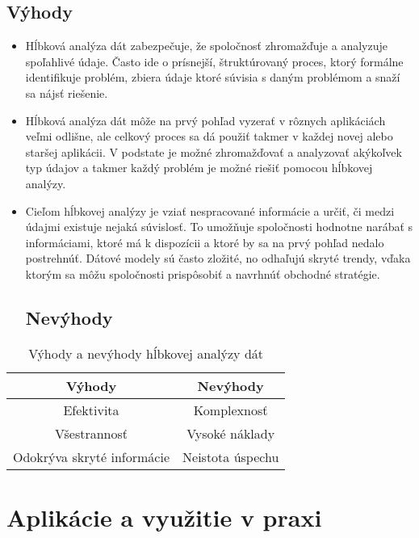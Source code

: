 \documentclass[10pt,twoside,slovak,a4paper]{article}
\begin{document}
\subsection{Výhody}
\begin{itemize}
\item Hĺbková analýza dát zabezpečuje, že spoločnosť zhromažďuje a analyzuje spoľahlivé údaje. Často ide o prísnejší, štruktúrovaný proces, ktorý formálne identifikuje problém, zbiera údaje ktoré súvisia s daným problémom a snaží sa nájsť riešenie.\cite{LunaCamp}
\item Hĺbková analýza dát môže na prvý pohľad vyzerať v rôznych aplikáciách veľmi odlišne, ale celkový proces sa dá použiť takmer v každej novej alebo staršej aplikácii. V podstate je možné zhromažďovať a analyzovať akýkoľvek typ údajov a takmer každý problém je možné riešiť pomocou hĺbkovej analýzy.
\item Cieľom hĺbkovej analýzy je vziať nespracované informácie a určiť, či medzi údajmi existuje nejaká súvislosť. To umožňuje spoločnosti hodnotne narábať s  informáciami, ktoré má k dispozícii a ktoré by sa na prvý pohľad nedalo postrehnúť. Dátové modely sú často zložité, no odhaľujú skryté trendy, vďaka ktorým sa môžu spoločnosti prispôsobiť a navrhnúť obchodné stratégie.\cite{AlexandraTwin}
\subsection{Nevýhody}
\end{itemize}
\begin{table}[h!]
    \centering
    \begin{tabular}{|c||c|}
        \hline
         Výhody &  Nevýhody\\
         \hline\hline
         Efektivita & Komplexnosť\\
         \hline
         Všestrannosť & Vysoké náklady\\
         \hline
         Odokrýva skryté informácie & Neistota úspechu\\
         \hline
    \end{tabular}
    \caption{Výhody a nevýhody hĺbkovej analýzy dát\cite{AlexandraTwin}}
    \label{tab:my_label}
\end{table}

\section{Aplikácie a využitie v praxi}





\end{document}
